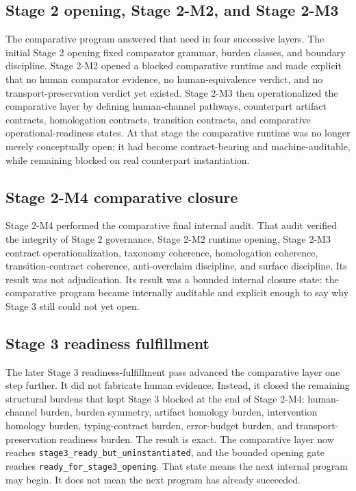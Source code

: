 \documentclass[11pt,a4paper]{article}
\theoremstyle{definition}
\begin{document}
\subsection{Stage 2 opening, Stage 2-M2, and Stage 2-M3}
The comparative program answered that need in four successive layers. The initial Stage 2 opening fixed comparator grammar, burden classes, and boundary discipline. Stage 2-M2 opened a blocked comparative runtime and made explicit that no human comparator evidence, no human-equivalence verdict, and no transport-preservation verdict yet existed. Stage 2-M3 then operationalized the comparative layer by defining human-channel pathways, counterpart artifact contracts, homologation contracts, transition contracts, and comparative operational-readiness states. At that stage the comparative runtime was no longer merely conceptually open; it had become contract-bearing and machine-auditable, while remaining blocked on real counterpart instantiation.

\subsection{Stage 2-M4 comparative closure}
Stage 2-M4 performed the comparative final internal audit. That audit verified the integrity of Stage 2 governance, Stage 2-M2 runtime opening, Stage 2-M3 contract operationalization, taxonomy coherence, homologation coherence, transition-contract coherence, anti-overclaim discipline, and surface discipline. Its result was not adjudication. Its result was a bounded internal closure state: the comparative program became internally auditable and explicit enough to say why Stage 3 still could not yet open.

\subsection{Stage 3 readiness fulfillment}
The later Stage 3 readiness-fulfillment pass advanced the comparative layer one step further. It did not fabricate human evidence. Instead, it closed the remaining structural burdens that kept Stage 3 blocked at the end of Stage 2-M4: human-channel burden, burden symmetry, artifact homology burden, intervention homology burden, typing-contract burden, error-budget burden, and transport-preservation readiness burden. The result is exact. The comparative layer now reaches \texttt{stage3\_ready\_but\_uninstantiated}, and the bounded opening gate reaches \texttt{ready\_for\_stage3\_opening}. That state means the next internal program may begin. It does not mean the next program has already succeeded.
\end{document}
